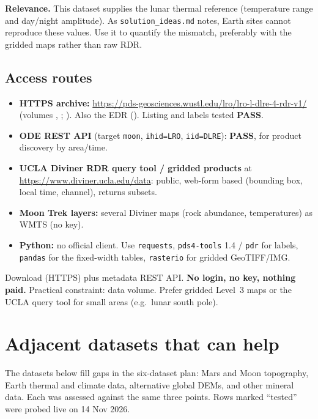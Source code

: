\documentclass[10pt,a4paper]{article}
\newcommand{\OK}{\textcolor{ok}{\textbf{PASS}}}
\begin{document}
\textbf{Relevance.} This dataset supplies the lunar thermal reference (temperature range and day/night amplitude). As \texttt{solution\_ideas.md} notes, Earth sites cannot reproduce these values. Use it to quantify the mismatch, preferably with the gridded maps rather than raw RDR.

\subsection{Access routes}
\begin{itemize}
\item \textbf{HTTPS archive:} \url{https://pds-geosciences.wustl.edu/lro/lro-l-dlre-4-rdr-v1/} (volumes , ; ). Also the EDR (). Listing and labels tested \OK{}.
\item \textbf{ODE REST API} (target \texttt{moon}, \texttt{ihid=LRO}, \texttt{iid=DLRE}): \OK{}, for product discovery by area/time.
\item \textbf{UCLA Diviner RDR query tool / gridded products} at \url{https://www.diviner.ucla.edu/data}: public, web-form based (bounding box, local time, channel), returns subsets.
\item \textbf{Moon Trek layers:} several Diviner maps (rock abundance, temperatures) as WMTS (no key).
\item \textbf{Python:} no official client. Use \texttt{requests}, \texttt{pds4-tools} 1.4 / \texttt{pdr} for labels, \texttt{pandas} for the fixed-width tables, \texttt{rasterio} for gridded GeoTIFF/IMG.
\end{itemize}
\begin{verdict}
Download (HTTPS) plus metadata REST API. \textbf{No login, no key, nothing paid.} Practical constraint: data volume. Prefer gridded Level~3 maps or the UCLA query tool for small areas (e.g.\ lunar south pole).
\end{verdict}

\section{Adjacent datasets that can help}
The datasets below fill gaps in the six-dataset plan: Mars and Moon topography, Earth thermal and climate data, alternative global DEMs, and other mineral data. Each was assessed against the same three points. Rows marked ``tested'' were probed live on 14 Nov 2026.
\end{document}
